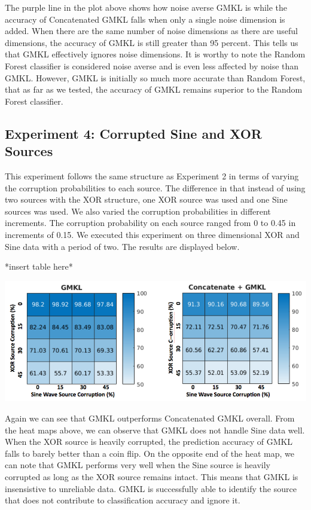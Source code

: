 \documentclass{article}
\begin{document}
The purple line in the plot above shows how noise averse GMKL is while the accuracy of Concatenated GMKL falls when only a single noise dimension is added. When there are the same number of noise dimensions as there are useful dimensions, the accuracy of GMKL is still greater than 95 percent. This tells us that GMKL effectively ignores noise dimensions. It is worthy to note the Random Forest classifier is considered noise averse and is even less affected by noise than GMKL. However, GMKL is initially so much more accurate than Random Forest, that as far as we tested, the accuracy of GMKL remains superior to the Random Forest classifier. 



\subsection{Experiment 4: Corrupted Sine and XOR Sources}

This experiment follows the same structure as Experiment 2 in terms of varying the corruption probabilities to each source. The difference in that instead of using two sources with the XOR structure, one XOR source was used and one Sine sources was used. We also varied the corruption probabilities in different increments. The corruption probability on each source ranged from 0 to 0.45 in increments of 0.15. We executed this experiment on three dimensional XOR and Sine data with a period of two. The results are displayed below.

*insert table here*
\begin{center}
\includegraphics[scale=0.5]{SineXORCorrupt.png}
\end{center}

Again we can see that GMKL outperforms Concatenated GMKL overall. From the heat maps above, we can observe that GMKL does not handle Sine data well. When the XOR source is heavily corrupted, the prediction accuracy of GMKL falls to barely better than a coin flip. On the opposite end of the heat map, we can note that GMKL performs very well when the Sine source is heavily corrupted as long as the XOR source remains intact. This means that GMKL is insensistive to unreliable data. GMKL is successfully able to identify the source that does not contribute to classification accuracy and ignore it. 
\end{document}
